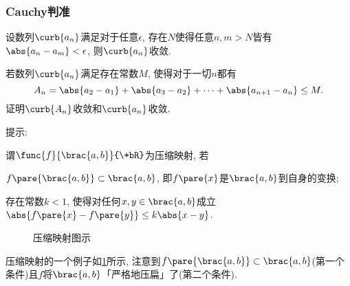 \documentclass{ctexart}
\begin{document}

\subsubsection{Cauchy判准} %
\label{ssub:cauchy判准}

\begin{theorem}[Cauchy判准]
    设数列$\curb{a_n}$满足对于任意$\epsilon$, 存在$N$使得任意$n,m>N$皆有$\abs{a_n - a_m} < \epsilon$, 则$\curb{a_n}$收敛.
\end{theorem}
\begin{sample}
    \begin{ex}
        若数列$\curb{a_n}$满足存在常数$M$, 使得对于一切$n$都有
        \[ A_n = \abs{a_2 - a_1} + \abs{a_3 - a_2} + \cdots + \abs{a_{n+1}-a_n} \le M. \]
        证明$\curb{A_n}$收敛和$\curb{a_n}$收敛.
    \end{ex}
    提示: 
\end{sample}
\begin{definition}[压缩映射]
    谓$\func{f}{\brac{a,b}}{\+bR}$为压缩映射, 若
    \begin{cenum}
        \item $f\pare{\brac{a,b}}\subset \brac{a,b}$, 即$f\pare{x}$是$\brac{a,b}$到自身的变换;
        \item 存在常数$k<1$, 使得对任何$x,y\in\brac{a,b}$成立$\abs{f\pare{x} - f\pare{y}} \le k\abs{x-y}$.
    \end{cenum}
\end{definition}
\begin{figure}[ht]
    \centering
    \begin{subfigure}{5cm}
        \centering
    \end{subfigure}
    \begin{subfigure}{5cm}
        \centering
    \end{subfigure}
    \begin{subfigure}{5cm}
        \centering
    \end{subfigure}
    \begin{subfigure}{5cm}
        \centering
    \end{subfigure}
    \caption{压缩映射图示}
    \label{fig:压缩映射图示}
\end{figure}
压缩映射的一个例子如\cref{fig:压缩映射图示}所示, 注意到$f\pare{\brac{a,b}}\subset \brac{a,b}$(第一个条件)且$f$将$\brac{a,b}$「严格地压扁」了(第二个条件).
\end{document}
